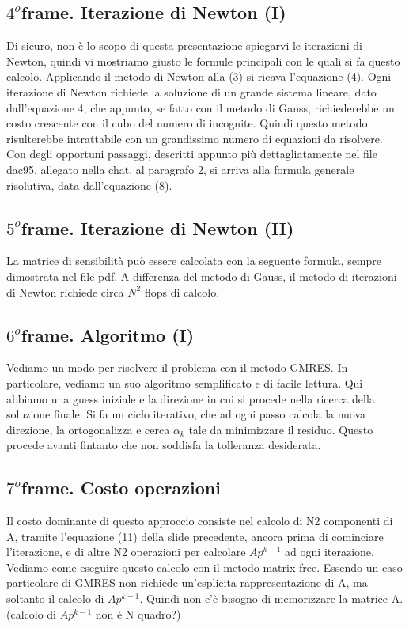 \documentclass[a4paper]{article}
\begin{document}
\subsection*{$4^o$frame. Iterazione di Newton (I)}
Di sicuro, non è lo scopo di questa presentazione spiegarvi le iterazioni di Newton, quindi vi mostriamo giusto le formule principali con le quali si fa questo calcolo. Applicando il metodo di Newton alla (3) si ricava l’equazione (4).
Ogni iterazione di Newton richiede la soluzione di un grande sistema lineare, dato dall’equazione 4, che appunto, se fatto con il metodo di Gauss, richiederebbe un costo crescente con il cubo del numero di incognite. Quindi questo metodo risulterebbe intrattabile con un grandissimo numero di equazioni da risolvere.
Con degli opportuni passaggi, descritti appunto più dettagliatamente nel file dac95, allegato nella chat, al paragrafo 2, si arriva alla formula generale risolutiva, data dall’equazione (8).
\subsection*{$5^o$frame. Iterazione di Newton (II)}
La matrice di sensibilità può essere calcolata con la seguente formula, sempre dimostrata nel file pdf. A differenza del metodo di Gauss, il metodo di iterazioni di Newton richiede circa $N^2$ flops di calcolo.
\subsection*{$6^o$frame. Algoritmo (I)}
Vediamo un modo per risolvere il problema con il metodo GMRES. In particolare, vediamo un suo algoritmo semplificato e di facile lettura. 
Qui abbiamo una guess iniziale e la direzione in cui si procede nella ricerca della soluzione finale. Si fa un ciclo iterativo, che ad ogni passo calcola la nuova direzione, la ortogonalizza e cerca $\alpha_k$ tale da minimizzare il residuo. Questo procede avanti fintanto che non soddisfa la tolleranza desiderata.
\subsection*{$7^o$frame. Costo operazioni}
Il costo dominante di questo approccio consiste nel calcolo di N2 componenti di A, tramite l’equazione (11) della slide precedente, ancora prima di cominciare l’iterazione, e di altre N2 operazioni per calcolare $Ap^{k-1}$ ad ogni iterazione.
Vediamo come eseguire questo calcolo con il metodo matrix-free. Essendo un caso particolare di GMRES non richiede un’esplicita rappresentazione di A, ma soltanto il calcolo di $Ap^{k-1}$. Quindi non c’è bisogno di memorizzare la matrice A. (calcolo di $Ap^{k-1}$ non è N quadro?)
\end{document}
